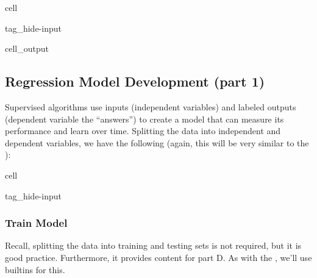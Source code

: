 \documentclass[letterpaper,10pt,english]{jupyterBook}
\begin{document}
\begin{sphinxuseclass}{cell}
\begin{sphinxuseclass}{tag_hide-input}\begin{sphinxVerbatimOutput}

\begin{sphinxuseclass}{cell_output}
\noindent{}

\end{sphinxuseclass}\end{sphinxVerbatimOutput}

\end{sphinxuseclass}
\end{sphinxuseclass}
\sphinxstepscope


\subsection{Regression Model Development (part 1)}
\label{\detokenize{task2_c/example_sup_reg/sup_reg_ex_develop:regression-model-development-part-1}}\label{\detokenize{task2_c/example_sup_reg/sup_reg_ex_develop:sup-reg-ex-develop}}\label{\detokenize{task2_c/example_sup_reg/sup_reg_ex_develop::doc}}
\sphinxAtStartPar
Supervised algorithms use inputs (independent variables) and labeled outputs (dependent variable \sphinxhyphen{}the “answers”) to create a model that can measure its performance and learn over time. Splitting the data into independent and dependent variables, we have the following (again, this will be very similar to the {\hyperref[\detokenize{task2_c/example_sup_class/sup_class_ex-develop:sup-class-ex-develop}]{}}):

\begin{sphinxuseclass}{cell}
\begin{sphinxuseclass}{tag_hide-input}
\end{sphinxuseclass}
\end{sphinxuseclass}

\subsubsection{Train Model}
\label{\detokenize{task2_c/example_sup_reg/sup_reg_ex_develop:train-model}}\label{\detokenize{task2_c/example_sup_reg/sup_reg_ex_develop:sup-reg-ex-develop-train}}
\sphinxAtStartPar
Recall, splitting the data into training and testing sets is not required, but it is good practice. Furthermore, it provides content for part D. As with the {\hyperref[\detokenize{task2_c/example_sup_class/sup_class_ex-develop:sup-class-ex-develop}]{}}, we’ll use  built\sphinxhyphen{}ins for this.
\end{document}

